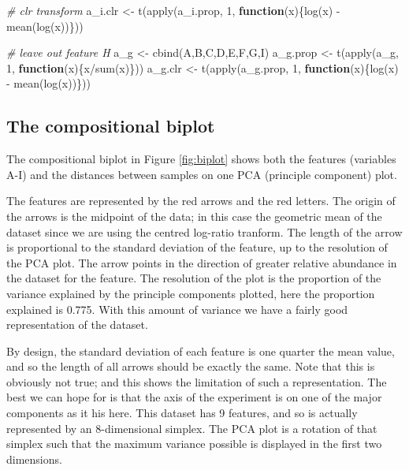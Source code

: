 \documentclass[
  onecolumn]{article}
\newenvironment{Shaded}{\begin{snugshade}}{\end{snugshade}}
\newcommand{\CommentTok}[1]{\textcolor[rgb]{0.56,0.35,0.01}{\textit{#1}}}
\newcommand{\ControlFlowTok}[1]{\textcolor[rgb]{0.13,0.29,0.53}{\textbf{#1}}}
\newcommand{\DecValTok}[1]{\textcolor[rgb]{0.00,0.00,0.81}{#1}}
\newcommand{\FunctionTok}[1]{\textcolor[rgb]{0.00,0.00,0.00}{#1}}
\newcommand{\NormalTok}[1]{#1}
\newcommand{\OtherTok}[1]{\textcolor[rgb]{0.56,0.35,0.01}{#1}}
\newcommand{\SpecialCharTok}[1]{\textcolor[rgb]{0.00,0.00,0.00}{#1}}
\begin{document}
\begin{Shaded}
\begin{Highlighting}[]
\CommentTok{\# clr transform}
\NormalTok{a\_i.clr }\OtherTok{\textless{}{-}} \FunctionTok{t}\NormalTok{(}\FunctionTok{apply}\NormalTok{(a\_i.prop, }\DecValTok{1}\NormalTok{, }\ControlFlowTok{function}\NormalTok{(x)\{}\FunctionTok{log}\NormalTok{(x) }\SpecialCharTok{{-}} \FunctionTok{mean}\NormalTok{(}\FunctionTok{log}\NormalTok{(x))\}))}

\CommentTok{\# leave out feature H}
\NormalTok{a\_g }\OtherTok{\textless{}{-}} \FunctionTok{cbind}\NormalTok{(A,B,C,D,E,F,G,I)}
\NormalTok{a\_g.prop }\OtherTok{\textless{}{-}} \FunctionTok{t}\NormalTok{(}\FunctionTok{apply}\NormalTok{(a\_g, }\DecValTok{1}\NormalTok{, }\ControlFlowTok{function}\NormalTok{(x)\{x}\SpecialCharTok{/}\FunctionTok{sum}\NormalTok{(x)\}))}
\NormalTok{a\_g.clr }\OtherTok{\textless{}{-}} \FunctionTok{t}\NormalTok{(}\FunctionTok{apply}\NormalTok{(a\_g.prop, }\DecValTok{1}\NormalTok{, }\ControlFlowTok{function}\NormalTok{(x)\{}\FunctionTok{log}\NormalTok{(x) }\SpecialCharTok{{-}} \FunctionTok{mean}\NormalTok{(}\FunctionTok{log}\NormalTok{(x))\}))}
\end{Highlighting}
\end{Shaded}

\hypertarget{the-compositional-biplot}{%
\subsection{The compositional biplot}\label{the-compositional-biplot}}

The compositional biplot in Figure \ref{fig:biplot} shows both the features (variables A-I) and the distances between samples on one PCA (principle component) plot.

The features are represented by the red arrows and the red letters. The origin of the arrows is the midpoint of the data; in this case the geometric mean of the dataset since we are using the centred log-ratio tranform. The length of the arrow is proportional to the standard deviation of the feature, up to the resolution of the PCA plot. The arrow points in the direction of greater relative abundance in the dataset for the feature. The resolution of the plot is the proportion of the variance explained by the principle components plotted, here the proportion explained is 0.775. With this amount of variance we have a fairly good representation of the dataset.

By design, the standard deviation of each feature is one quarter the mean value, and so the length of all arrows should be exactly the same. Note that this is obviously not true; and this shows the limitation of such a representation. The best we can hope for is that the axis of the experiment is on one of the major components as it his here. This dataset has 9 features, and so is actually represented by an 8-dimensional simplex. The PCA plot is a rotation of that simplex such that the maximum variance possible is displayed in the first two dimensions.
\end{document}
